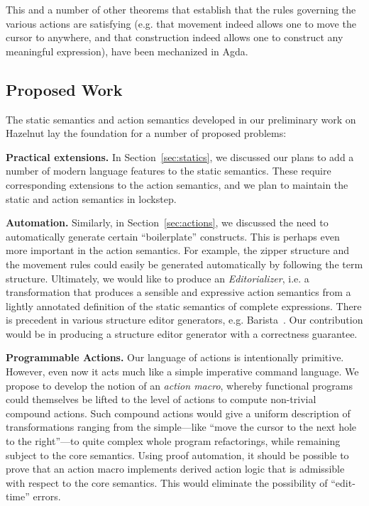 This and a number of other theorems that establish that the rules governing
the various actions are satisfying (e.g. that movement indeed allows one 
to move the cursor to anywhere, and that construction indeed allows one 
to construct any meaningful expression), have been mechanized in Agda.




\subsection{Proposed Work}
The static semantics and action semantics developed in our preliminary work on Hazelnut lay the foundation for a number of proposed problems:

\vspace{0.25ex}
\noindent\textbf{Practical extensions.} In Section~\ref{sec:statics}, we
discussed our plans to add a number of modern language features to the static
semantics. These require corresponding extensions to the action semantics, and
we plan to maintain the static and action semantics in lockstep. 

\vspace{0.25ex}
\noindent\textbf{Automation.} Similarly, in Section~\ref{sec:actions}, we
discussed the need to automatically generate certain ``boilerplate''
constructs. This is perhaps even more important in the action semantics. For
example, the zipper structure and the movement rules could easily be generated
automatically by following the term structure. Ultimately, we would like to
produce an \emph{Editorializer}, i.e. a transformation that produces a sensible
and expressive action semantics from a lightly annotated definition of the
static semantics of complete expressions. There is precedent in various
structure editor generators, e.g. Barista~\cite{ko_barista:_2006}. Our
contribution would be in producing a structure editor generator with a
correctness guarantee. 

\vspace{0.25ex}
\noindent\textbf{Programmable Actions.} Our language of actions is intentionally primitive. However, even now it
acts much like a simple imperative command language. We propose to develop the
notion of an \emph{action macro}, whereby 
functional programs could themselves be lifted to the level of actions to
compute non-trivial compound actions. Such compound actions would give a
uniform description of transformations ranging from the simple---like
``move the cursor to the next hole to the right''---to quite complex whole
program refactorings, while remaining subject to the core semantics. Using proof automation, it should be possible to prove that an action macro implements derived action logic that 
is admissible with respect to the core semantics. This would eliminate the possibility of ``edit-time'' errors.

